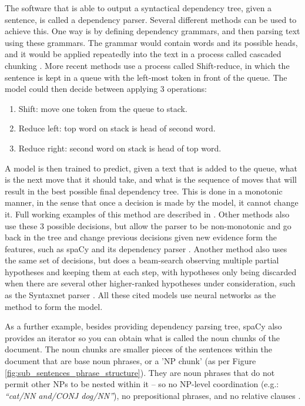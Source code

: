 \documentclass[11pt,a4paper,openright]{memoir}
\begin{document}
The software that is able to output a syntactical dependency tree, given a sentence, is called a dependency parser. Several different methods can be used to achieve this. One way is by defining dependency grammars, and then parsing text using these grammars. The grammar would contain words and its possible heads, and it would be applied repeatedly into the text in a process called cascaded chunking \cite{BirdKleinLoper09}. More recent methods use a process called Shift-reduce, in which the sentence is kept in a queue with the left-most token in front of the queue. The model could then decide between applying 3 operations:
\begin{enumerate}
  \item Shift: move one token from the queue to stack.
  \item Reduce left: top word on stack is head of second word.
  \item Reduce right: second word on stack is head of top word.
\end{enumerate}

A model is then trained to predict, given a text that is added to the queue, what is the next move that it should take, and what is the sequence of moves that will result in the best possible final dependency tree. This is done in a monotonic manner, in the sense that once a decision is made by the model, it cannot change it. Full working examples of this method are described in \cite{chen-manning:2014:EMNLP2014}. Other methods also use these 3 possible decisions, but allow the parser to be non-monotonic and go back in the tree and change previous decisions given new evidence form the features, such as spaCy and its dependency parser \cite{honnibal-johnson:2015:EMNLP, spacy}. Another method also uses the same set of decisions, but does a beam-search observing multiple partial hypotheses and keeping them at each step, with hypotheses only being discarded when there are several other higher-ranked hypotheses under consideration, such as the Syntaxnet parser \cite{google-syntaxnet, DBLP:journals/corr/AndorAWSPGPC16}. All these cited models use neural networks as the method to form the model.

As a further example, besides providing dependency parsing tree, spaCy also provides an iterator so you can obtain what is called the noun chunks of the document. The noun chunks are smaller pieces of the sentences within the document that are base noun phrases, or a 'NP chunk' (as per Figure \ref{fig:sub_sentences_phrase_structure}). They are noun phrases that do not permit other NPs to be nested within it – so no NP-level coordination (e.g.: \emph{\enquote{cat/NN and/CONJ dog/NN}}), no prepositional phrases, and no relative clauses \cite{spacy}.
\end{document}
